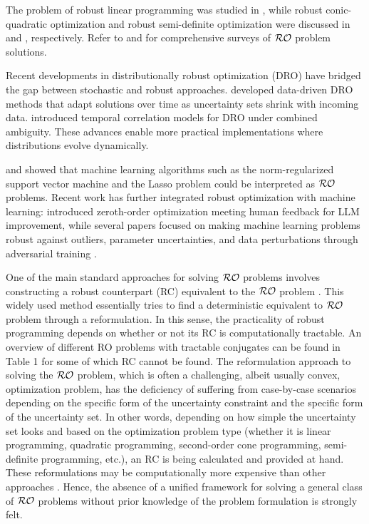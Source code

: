 \documentclass[journal,twoside,web]{ieeecolor}
\begin{document}
{\color{blue} The problem of robust linear programming was studied in \cite{bental1999}, while robust conic-quadratic optimization and robust semi-definite optimization were discussed in \cite{bental2002} and \cite{bental1998}, respectively. Refer to \cite{bertsimas2011} and \cite{beyer2007} for comprehensive surveys of ${\cal RO}$ problem solutions.

Recent developments in distributionally robust optimization (DRO) have bridged the gap between stochastic and robust approaches. \cite{aigner2023} developed data-driven DRO methods that adapt solutions over time as uncertainty sets shrink with incoming data. \cite{yang2023} introduced temporal correlation models for DRO under combined ambiguity. These advances enable more practical implementations where distributions evolve dynamically.

\cite{xu2009} and \cite{xu2010} showed that machine learning algorithms such as the norm-regularized support vector machine and the Lasso problem could be interpreted as ${\cal RO}$ problems. Recent work has further integrated robust optimization with machine learning: \cite{zoranksg2023} introduced zeroth-order optimization meeting human feedback for LLM improvement, while several papers focused on making machine learning problems robust against outliers, parameter uncertainties, and data perturbations through adversarial training \cite{lanckriet2003, bhattacharyya2004a, bhattacharyya2004b, trafalis2007, namkoong2016, sinha2018, esfandiari2019}.}

One of the main standard approaches for solving ${\cal RO}$ problems involves constructing a robust counterpart (RC) equivalent to the ${\cal RO}$ problem \cite{bental2009}. This widely used method essentially tries to find a deterministic equivalent to ${\cal RO}$ problem through a reformulation. In this sense, the practicality of robust programming depends on whether or not its RC is computationally tractable. An overview of different RO problems with tractable conjugates can be found in \cite{gorissen20152} Table 1 for some of which RC cannot be found.
The reformulation approach to solving the ${\cal RO}$ problem, which is often a challenging, albeit usually convex, optimization problem, has the deficiency of suffering from case-by-case scenarios depending on the specific form of the uncertainty constraint and the specific form of the uncertainty set. In other words, depending on how simple the uncertainty set looks and based on the optimization problem type (whether it is linear programming, quadratic programming, second-order cone programming, semi-definite programming, etc.), an RC is being calculated and provided at hand. These reformulations may be computationally more expensive than other approaches \cite{bertsimas2016}. Hence, the absence of a unified framework for solving a general class of ${\cal RO}$ problems without prior knowledge of the problem formulation is strongly felt.
\end{document}
